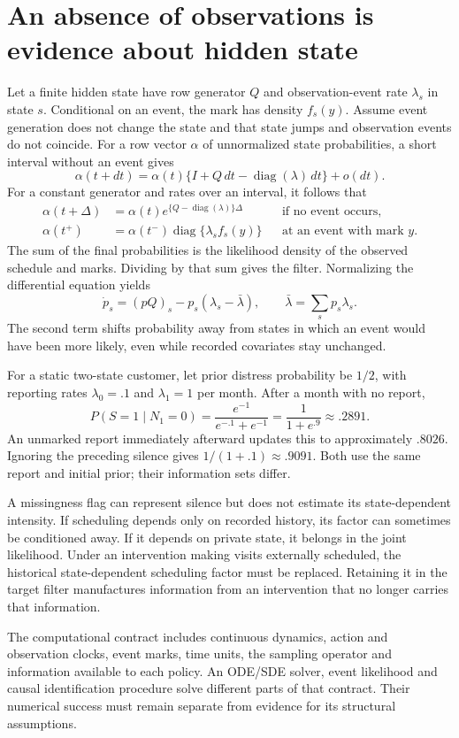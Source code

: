 \section{An absence of observations is evidence about hidden state}
\label{r3:no-event-filter}
Let a finite hidden state have row generator $Q$ and observation-event
rate $\lambda_s$ in state $s$. Conditional on an event, the mark has
density $f_s(y)$. Assume event generation does not change the state and
that state jumps and observation events do not coincide.
For a row vector $\alpha$ of unnormalized state probabilities, a short
interval without an event gives
\[
 \alpha(t+dt)=\alpha(t)\{I+Q\,dt-\operatorname{diag}(\lambda)\,dt\}
               +o(dt).
\]
For a constant generator and rates over an interval, it follows that
\begin{align}
 \alpha(t+\Delta)&=\alpha(t)
       e^{\{Q-\operatorname{diag}(\lambda)\}\Delta}
                    &&\text{if no event occurs},\\
 \alpha(t^+)&=\alpha(t^-)
       \operatorname{diag}\{\lambda_s f_s(y)\}
                    &&\text{at an event with mark }y .
 \label{r3:event-filter}
\end{align}
The sum of the final probabilities is the likelihood density of the
observed schedule and marks. Dividing by that sum gives the filter.
Normalizing the differential equation yields
\[
 \dot p_s=(pQ)_s-p_s(\lambda_s-\bar\lambda),
 \qquad \bar\lambda=\sum_s p_s\lambda_s .
\]
The second term shifts probability away from states in which an event
would have been more likely, even while recorded covariates stay unchanged.

For a static two-state customer, let prior distress probability be $1/2$,
with reporting rates $\lambda_0=.1$ and $\lambda_1=1$ per month.
After a month with no report,
\[
 P(S=1\mid N_1=0)=\frac{e^{-1}}{e^{-.1}+e^{-1}}
                 =\frac{1}{1+e^{.9}}\approx .2891.
\]
An unmarked report immediately afterward updates this to approximately
$.8026$. Ignoring the preceding silence gives $1/(1+.1)\approx .9091$.
Both use the same report and initial prior; their information sets differ.

A missingness flag can represent silence but does not estimate its
state-dependent intensity. If scheduling depends only on recorded history,
its factor can sometimes be conditioned away. If it depends on private
state, it belongs in the joint likelihood. Under an intervention making
visits externally scheduled, the historical state-dependent scheduling
factor must be replaced. Retaining it in the target filter manufactures
information from an intervention that no longer carries that information.

The computational contract includes continuous dynamics, action and
observation clocks, event marks, time units, the sampling operator and
information available to each policy. An ODE/SDE solver, event likelihood
and causal identification procedure solve different parts of that contract.
Their numerical success must remain separate from evidence for its
structural assumptions.
